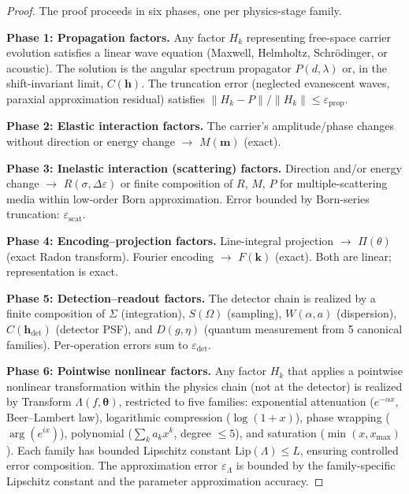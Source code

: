\documentclass[11pt]{article}
\begin{document}
\begin{proof}
The proof proceeds in six phases, one per physics-stage family.

\medskip
\noindent\textbf{Phase 1: Propagation factors.}
Any factor $H_k$ representing free-space carrier evolution satisfies a linear wave equation (Maxwell, Helmholtz, Schr\"{o}dinger, or acoustic). The solution is the angular spectrum propagator $P(d, \lambda)$ or, in the shift-invariant limit, $C(\mathbf{h})$. The truncation error (neglected evanescent waves, paraxial approximation residual) satisfies $\|H_k - P\|/\|H_k\| \leq \varepsilon_{\mathrm{prop}}$.

\medskip
\noindent\textbf{Phase 2: Elastic interaction factors.}
The carrier's amplitude/phase changes without direction or energy change $\to$ $M(\mathbf{m})$ (exact).

\medskip
\noindent\textbf{Phase 3: Inelastic interaction (scattering) factors.}
Direction and/or energy change $\to$ $R(\sigma, \Delta\varepsilon)$ or finite composition of $R$, $M$, $P$ for multiple-scattering media within low-order Born approximation. Error bounded by Born-series truncation: $\varepsilon_{\mathrm{scat}}$.

\medskip
\noindent\textbf{Phase 4: Encoding--projection factors.}
Line-integral projection $\to$ $\Pi(\theta)$ (exact Radon transform). Fourier encoding $\to$ $F(\mathbf{k})$ (exact). Both are linear; representation is exact.

\medskip
\noindent\textbf{Phase 5: Detection--readout factors.}
The detector chain is realized by a finite composition of $\Sigma$ (integration), $S(\Omega)$ (sampling), $W(\alpha, a)$ (dispersion), $C(\mathbf{h}_{\mathrm{det}})$ (detector PSF), and $D(g, \eta)$ (quantum measurement from 5 canonical families). Per-operation errors sum to $\varepsilon_{\mathrm{det}}$.

\medskip
\noindent\textbf{Phase 6: Pointwise nonlinear factors.}
Any factor $H_k$ that applies a pointwise nonlinear transformation within the physics chain (not at the detector) is realized by Transform $\Lambda(f, \boldsymbol{\theta})$, restricted to five families: exponential attenuation ($e^{-\alpha x}$, Beer--Lambert law), logarithmic compression ($\log(1 + x)$), phase wrapping ($\arg(e^{ix})$), polynomial ($\sum_k a_k x^k$, degree $\leq 5$), and saturation ($\min(x, x_{\max})$). Each family has bounded Lipschitz constant $\mathrm{Lip}(\Lambda) \leq L$, ensuring controlled error composition. The approximation error $\varepsilon_{\Lambda}$ is bounded by the family-specific Lipschitz constant and the parameter approximation accuracy.


\end{proof}
\end{document}
